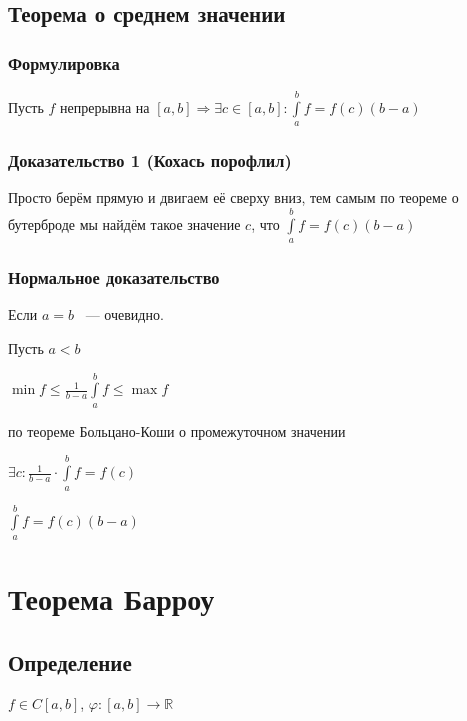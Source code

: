 \documentclass{article}
\begin{document}
		\subsection{Теорема о среднем значении}
		
			\subsubsection{Формулировка}
			
                Пусть $f$ непрерывна на $[a, b] \Rightarrow \exists c \in [a, b]: \int\limits^b_a f = f(c)(b-a)$
		
            \subsubsection{Доказательство 1 (Кохась порофлил)}
		
                Просто берём прямую и двигаем её сверху вниз, тем самым по теореме о бутерброде мы найдём такое значение $c$, что $\int\limits^b_a f = f(c)(b - a)$
			
            \subsubsection{Нормальное доказательство}
		
                Если $a = b$ ~--- очевидно.
			
                Пусть $a < b$
			
                $\min f \leq \frac{1}{b - a} \int\limits^b_a f \leq \max f$
			
                по теореме Больцано-Коши о промежуточном значении
			
                $\exists c : \frac{1}{b - a} \cdot \int\limits^b_a f = f(c)$
                
                $\int\limits^b_a f = f(c)(b - a)$
			
	\newpage
	
	\section{Теорема Барроу}
	
		\subsection{Определение}
		
			$f \in C[a, b]$, $\varphi : [a, b] \rightarrow \mathbb{R}$
		
\end{document}
